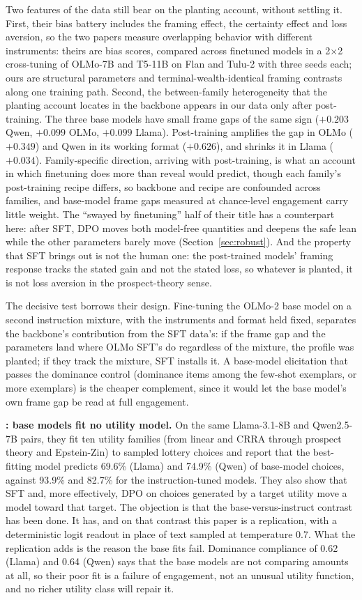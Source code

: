 \documentclass[11pt]{article}
\begin{document}
Two features of the data still bear on the planting account, without settling it. First, their bias
battery includes the framing effect, the certainty effect and loss aversion, so the two papers measure
overlapping behavior with different instruments: theirs are bias scores, compared across finetuned models
in a 2$\times$2 cross-tuning of OLMo-7B and T5-11B on Flan and Tulu-2 with three seeds each; ours are
structural parameters and terminal-wealth-identical framing contrasts along one training path. Second,
the between-family heterogeneity that the planting account locates in the backbone appears in our data only after post-training. The
three base models have small frame gaps of the same sign ($+0.203$ Qwen, $+0.099$ OLMo, $+0.099$
Llama). Post-training amplifies the gap in OLMo ($+0.349$) and Qwen in its working format ($+0.626$),
and shrinks it in Llama ($+0.034$). Family-specific direction, arriving with post-training, is what an
account in which finetuning does more than reveal would predict, though each family's post-training
recipe differs, so backbone and recipe are confounded across families, and base-model frame gaps
measured at chance-level engagement carry little weight. The ``swayed by finetuning'' half of
their title has a counterpart here: after SFT, DPO moves both model-free quantities and deepens the safe
lean while the other parameters barely move (Section~\ref{sec:robust}). And the property that SFT
brings out is not the human one: the post-trained models' framing response tracks the stated gain and
not the stated loss, so whatever is planted, it is not loss aversion in the prospect-theory sense.

The decisive test borrows their design. Fine-tuning the OLMo-2 base model on a second instruction
mixture, with the instruments and format held fixed, separates the backbone's contribution from the SFT
data's: if the frame gap and the parameters land where OLMo SFT's do regardless of the mixture, the
profile was planted; if they track the mixture, SFT installs it. A base-model elicitation that passes
the dominance control (dominance items among the few-shot exemplars, or more exemplars) is the cheaper
complement, since it would let the base model's own frame gap be read at full engagement.

\textbf{\citet{wang2025}: base models fit no utility model.} On the same Llama-3.1-8B and Qwen2.5-7B
pairs, they fit ten utility families (from linear and CRRA through prospect theory and Epstein-Zin) to
sampled lottery choices and report that the best-fitting model predicts 69.6\% (Llama) and 74.9\% (Qwen)
of base-model choices, against 93.9\% and 82.7\% for the instruction-tuned models. They also show that
SFT and, more effectively, DPO on choices generated by a target utility move a model toward that target.
The objection is that the base-versus-instruct contrast has been done. It has, and on that contrast this
paper is a replication, with a deterministic logit readout in place of text sampled at temperature 0.7.
What the replication adds is the reason the base fits fail. Dominance compliance of 0.62 (Llama) and 0.64
(Qwen) says that the base models are not comparing amounts at all, so their poor fit is a failure of
engagement, not an unusual utility function, and no richer utility class will repair it.
\end{document}
